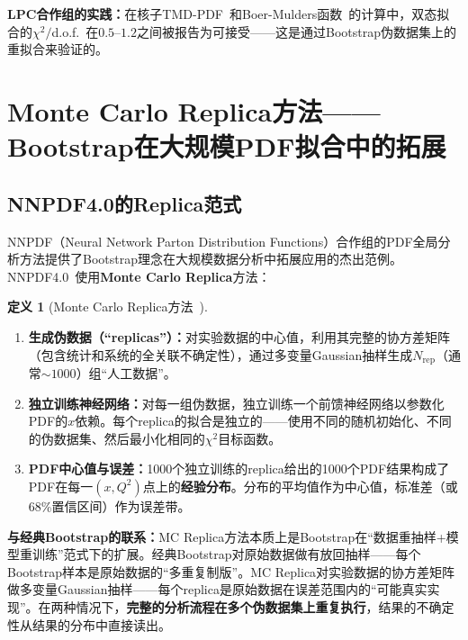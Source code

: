 \documentclass[12pt,a4paper]{ctexart}
\theoremstyle{definition}
\newtheorem{definition}{定义}[section]
\begin{document}
\textbf{LPC合作组的实践：}在核子TMD-PDF~\cite{He2024unpolTMD}和Boer-Mulders函数~\cite{Ma2025BoerMulders}的计算中，双态拟合的$\chi^2/$d.o.f.\ 在$0.5\text{--}1.2$之间被报告为可接受——这是通过Bootstrap伪数据集上的重拟合来验证的。

\section{Monte Carlo Replica方法——Bootstrap在大规模PDF拟合中的拓展}

\subsection{NNPDF4.0的Replica范式}

NNPDF（Neural Network Parton Distribution Functions）合作组的PDF全局分析方法提供了Bootstrap理念在大规模数据分析中拓展应用的杰出范例。NNPDF4.0~\cite{NNPDF2021}使用\textbf{Monte Carlo Replica}方法：

\begin{definition}[Monte Carlo Replica方法~\cite{NNPDF2021}]
\begin{enumerate}[nosep]
    \item \textbf{生成伪数据（``replicas''）：}对实验数据的中心值，利用其完整的协方差矩阵（包含统计和系统的全关联不确定性），通过多变量Gaussian抽样生成$N_{\text{rep}}$（通常$\sim 1000$）组``人工数据''。
    \item \textbf{独立训练神经网络：}对每一组伪数据，独立训练一个前馈神经网络以参数化PDF的$x$依赖。每个replica的拟合是独立的——使用不同的随机初始化、不同的伪数据集、然后最小化相同的$\chi^2$目标函数。
    \item \textbf{PDF中心值与误差：}1000个独立训练的replica给出的1000个PDF结果构成了PDF在每一$(x, Q^2)$点上的\textbf{经验分布}。分布的平均值作为中心值，标准差（或68\%置信区间）作为误差带。
\end{enumerate}
\end{definition}

\textbf{与经典Bootstrap的联系：}MC Replica方法本质上是Bootstrap在``数据重抽样+模型重训练''范式下的扩展。经典Bootstrap对原始数据做有放回抽样——每个Bootstrap样本是原始数据的``多重复制版''。MC Replica对实验数据的协方差矩阵做多变量Gaussian抽样——每个replica是原始数据在误差范围内的``可能真实实现''。在两种情况下，\textbf{完整的分析流程在多个伪数据集上重复执行}，结果的不确定性从结果的分布中直接读出。
\end{document}
